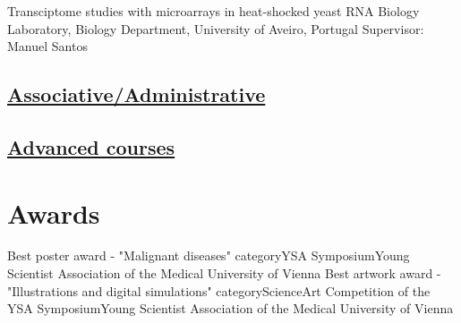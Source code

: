 \documentclass[11pt,a4paper,roman]{moderncv} %
\begin{document}
            {Transciptome studies with microarrays in heat-shocked yeast}
            {RNA Biology Laboratory, Biology Department, University of Aveiro, Portugal}{}
            {}
            {Supervisor: Manuel Santos}

    \subsection{\underline{Associative/Administrative}}


    \subsection{\underline{Advanced courses}}


\section{Awards}

        {Best poster award - "Malignant diseases" category}{YSA Symposium}{}{}{Young Scientist Association of the Medical University of Vienna}
        {Best artwork award - "Illustrations and digital simulations" category}{ScienceArt Competition of the YSA Symposium}{}{}{Young Scientist Association of the Medical University of Vienna}
\end{document}

